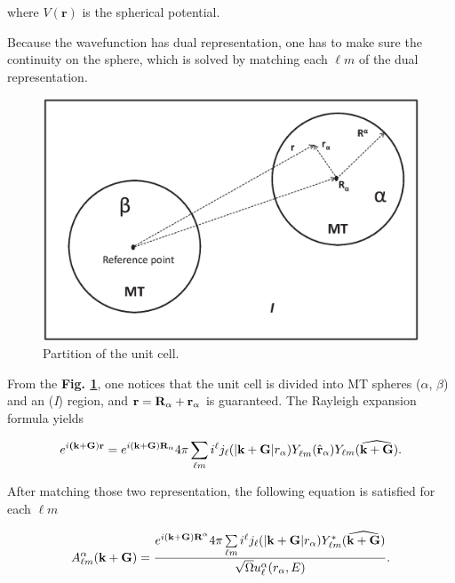 \documentclass[a4paper, 12pt, titlepage,oneside,drop]{kthesis}
\begin{document}
where $V(\textbf{r})$ is the spherical potential.

Because the wavefunction has dual representation, one has to make sure the continuity on the sphere, which is solved by matching each $\ell m$
of the dual representation.

\begin{figure}[h]
\begin{center}
\includegraphics[scale=0.5]{unitcell.eps}
\caption{Partition of the unit cell.}
\label{ucuc}
\end{center}
\end{figure}

From the \textbf{Fig. \ref{ucuc}}, one notices that the unit cell is divided into MT spheres ($\alpha$, $\beta$) and an
(\textit{I}) region, and ${\textbf r = {\textbf R_{\alpha}}+{\textbf r_{\alpha}}}$ is guaranteed. The Rayleigh expansion formula yields

\begin{equation}
\expg<(\textbf {k}+\textbf{G})> = e^{i (\textbf {k}+\textbf{G}) \textbf{R}_{\alpha} } 4 \pi \sumlm<\ell><m> i^{\ell} \bessf< |\textbf{k}+\textbf{G}|> \sphfr<\ell{m}><r><> Y_{\ell{m}}(\widehat{\textbf{k}+\textbf{G}}).
\end{equation}
  
After matching those two representation, the following equation is satisfied for each ${\ell}m$

\begin{equation}
A _{{\ell}m}^{\alpha} (\textbf {k}+\textbf{G}) = \frac{ e^{i (\textbf {k}+\textbf{G}) \textbf{R}^{\alpha} } 4 \pi \sumlm<\ell><m> i^{\ell} \bessf< |\textbf{k}+\textbf{G}|> Y^{*}_{\ell{m}}(\widehat{\textbf{k}+\textbf{G}}) }{\sqrt{\Omega} u_{{\ell}}^{\alpha}(r_{\alpha}, E)}.
\end{equation}
\end{document}
